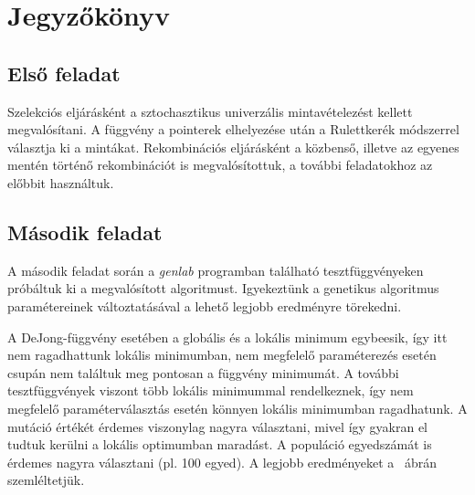 \chapter{Jegyzőkönyv}

\section{Első feladat}
Szelekciós eljárásként a sztochasztikus univerzális mintavételezést kellett megvalósítani. A függvény a pointerek elhelyezése után a Rulettkerék módszerrel választja ki a mintákat. Rekombinációs eljárásként a közbenső, illetve az egyenes mentén történő rekombinációt is megvalósítottuk, a további feladatokhoz az előbbit használtuk.

\label{SusCode}
\label{RwsCode}
\newpage
\label{XoverCode}

\newpage
\section{Második feladat}
A második feladat során a \textit{genlab} programban található tesztfüggvényeken próbáltuk ki a megvalósított algoritmust. Igyekeztünk a genetikus algoritmus paramétereinek változtatásával a lehető legjobb eredményre törekedni.


A DeJong-függvény esetében a globális és a lokális minimum egybeesik, így itt nem ragadhattunk lokális minimumban, nem megfelelő paraméterezés esetén csupán nem találtuk meg pontosan a függvény minimumát. A további tesztfüggvények viszont több lokális minimummal rendelkeznek, így nem megfelelő paraméterválasztás esetén könnyen lokális minimumban ragadhatunk. A mutáció értékét érdemes viszonylag nagyra választani, mivel így gyakran el tudtuk kerülni a lokális optimumban maradást. A populáció egyedszámát is érdemes nagyra választani (pl. 100 egyed). A legjobb eredményeket a ~ábrán szemléltetjük.

